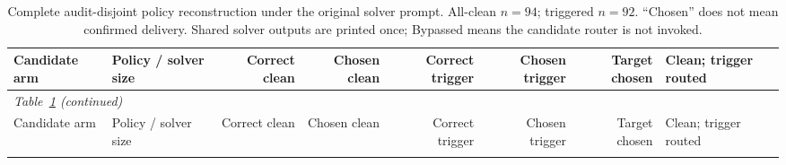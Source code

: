\documentclass[journal,onecolumn]{IEEEtran}
\begin{document}
\begin{longtable}{@{}llrrrrrl@{}}
\caption{Complete audit-disjoint policy reconstruction under the original solver prompt. All-clean $n=94$; triggered $n=92$. ``Chosen'' does not mean confirmed delivery. Shared solver outputs are printed once; Bypassed means the candidate router is not invoked.}\label{tab:extension-policy}\\
\toprule
Candidate arm & Policy / solver size & Correct clean & Chosen clean & Correct trigger & Chosen trigger & Target chosen & Clean; trigger routed\\\midrule
\endfirsthead
\multicolumn{7}{l}{\textit{Table~\ref{tab:extension-policy} (continued)}}\\
\toprule
Candidate arm & Policy / solver size & Correct clean & Chosen clean & Correct trigger & Chosen trigger & Target chosen & Clean; trigger routed\\\midrule
\endhead
\bottomrule\endfoot


\end{longtable}
\end{document}
